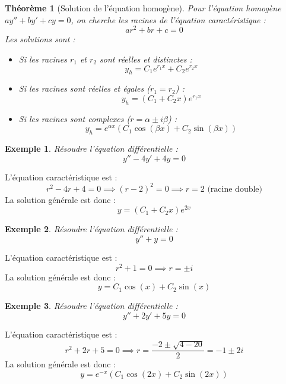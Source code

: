 \documentclass[12pt]{article}
\newtheorem{theorem}{Théorème}[section]
\newtheorem{example}{Exemple}[section]
\begin{document}
\begin{theorem}[Solution de l'équation homogène]
Pour l'équation homogène $a y'' + b y' + c y = 0$, on cherche les racines de l'équation caractéristique :
\[
a r^2 + b r + c = 0
\]
Les solutions sont :
\begin{itemize}
    \item Si les racines $r_1$ et $r_2$ sont réelles et distinctes :
    \[
    y_h = C_1 e^{r_1 x} + C_2 e^{r_2 x}
    \]
    \item Si les racines sont réelles et égales ($r_1 = r_2$) :
    \[
    y_h = (C_1 + C_2 x) e^{r_1 x}
    \]
    \item Si les racines sont complexes ($r = \alpha \pm i \beta$) :
    \[
    y_h = e^{\alpha x} \left( C_1 \cos(\beta x) + C_2 \sin(\beta x) \right)
    \]
\end{itemize}
\end{theorem}

\begin{example}
Résoudre l'équation différentielle :
\[
y'' - 4y' + 4y = 0
\]
\end{example}

\begin{mybox}[Solution]
L'équation caractéristique est :
\[
r^2 - 4r + 4 = 0 \implies (r - 2)^2 = 0 \implies r = 2 \text{ (racine double)}
\]
La solution générale est donc :
\[
\boxed{y = (C_1 + C_2 x) e^{2x}}
\]
\end{mybox}

\begin{example}
Résoudre l'équation différentielle :
\[
y'' + y = 0
\]
\end{example}

\begin{mybox}[Solution]
L'équation caractéristique est :
\[
r^2 + 1 = 0 \implies r = \pm i
\]
La solution générale est donc :
\[
\boxed{y = C_1 \cos(x) + C_2 \sin(x)}
\]
\end{mybox}

\begin{example}
Résoudre l'équation différentielle :
\[
y'' + 2y' + 5y = 0
\]
\end{example}

\begin{mybox}[Solution]
L'équation caractéristique est :
\[
r^2 + 2r + 5 = 0 \implies r = \frac{-2 \pm \sqrt{4 - 20}}{2} = -1 \pm 2i
\]
La solution générale est donc :
\[
\boxed{y = e^{-x} \left( C_1 \cos(2x) + C_2 \sin(2x) \right)}
\]
\end{mybox}
\end{document}
